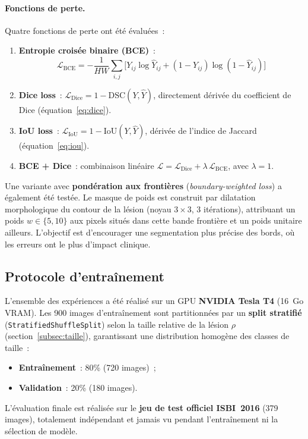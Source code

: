 \documentclass[12pt,a4paper]{article}
\begin{document}
\paragraph{Fonctions de perte.} Quatre fonctions de perte ont été évaluées~:
\begin{enumerate}[nosep]
    \item \textbf{Entropie croisée binaire (BCE)}~:
    \begin{equation}
        \mathcal{L}_{\text{BCE}} = -\frac{1}{HW}\sum_{i,j} \Big[Y_{ij} \log \hat{Y}_{ij} + (1 - Y_{ij}) \log(1 - \hat{Y}_{ij})\Big]
        \label{eq:bce}
    \end{equation}
    \item \textbf{Dice loss}~: $\mathcal{L}_{\text{Dice}} = 1 - \text{DSC}(Y, \hat{Y})$, directement dérivée du coefficient de Dice (équation~\ref{eq:dice}).
    \item \textbf{IoU loss}~: $\mathcal{L}_{\text{IoU}} = 1 - \text{IoU}(Y, \hat{Y})$, dérivée de l'indice de Jaccard (équation~\ref{eq:iou}).
    \item \textbf{BCE + Dice}~: combinaison linéaire $\mathcal{L} = \mathcal{L}_{\text{Dice}} + \lambda\, \mathcal{L}_{\text{BCE}}$, avec $\lambda = 1$.
\end{enumerate}

Une variante avec \textbf{pondération aux frontières} (\emph{boundary-weighted loss}) a également été testée. Le masque de poids est construit par dilatation morphologique du contour de la lésion (noyau $3 \times 3$, 3 itérations), attribuant un poids $w \in \{5, 10\}$ aux pixels situés dans cette bande frontière et un poids unitaire ailleurs. L'objectif est d'encourager une segmentation plus précise des bords, où les erreurs ont le plus d'impact clinique.

\subsection{Protocole d'entraînement}
\label{subsec:protocole_entrainement}

L'ensemble des expériences a été réalisé sur un GPU \textbf{NVIDIA Tesla T4} (16~Go VRAM). Les 900 images d'entraînement sont partitionnées par un \textbf{split stratifié} (\texttt{StratifiedShuffleSplit}) selon la taille relative de la lésion $\rho$ (section~\ref{subsec:taille}), garantissant une distribution homogène des classes de taille~:
\begin{itemize}[nosep]
    \item \textbf{Entraînement}~: 80\% (720 images)~;
    \item \textbf{Validation}~: 20\% (180 images).
\end{itemize}
L'évaluation finale est réalisée sur le \textbf{jeu de test officiel ISBI~2016} (379 images), totalement indépendant et jamais vu pendant l'entraînement ni la sélection de modèle.
\end{document}
